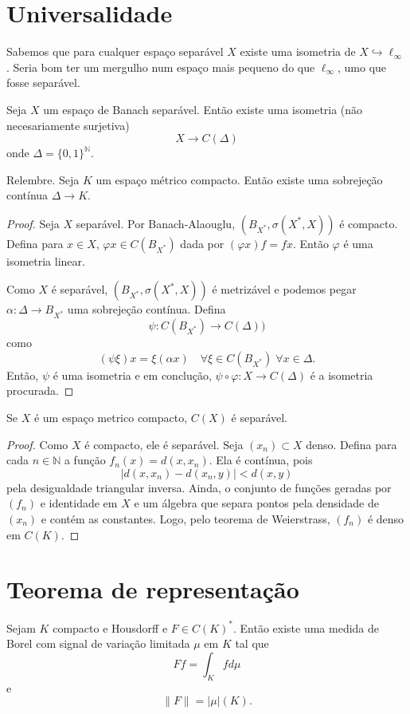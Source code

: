 \documentclass[portuguese]{article}
\theoremstyle{definition}
\newcommand{\N}{\mathbb{N}}
\begin{document}
\section{Universalidade}
Sabemos que para cualquer espaço separável $X$ existe uma isometria de $X\hookrightarrow\ell_\infty$. Seria bom ter um mergulho num espaço mais pequeno do que $\ell_\infty$, umo que fosse separável.

\begin{teo}
	Seja $X$ um espaço de Banach separável. Então existe uma isometria (não necesariamente surjetiva)
	\[X\to C(\Delta)\]
	onde $\Delta=\{0,1\}^\N$.
\end{teo}
\begin{obs}
	Relembre. Seja $K$ um espaço métrico compacto. Então existe uma sobrejeção contínua $\Delta\to K$.
\end{obs}
\begin{proof}
	Seja $X$ separável. Por Banach-Alaouglu, $(B_{X^*},\sigma(X^*,X))$ é compacto. Defina para $x\in X$, $\varphi x\in C(B_{X^*})$ dada por $(\varphi x)f=fx$. Então $\varphi$ é uma isometria linear.
	
	Como $X$ é separável, $(B_{X^*},\sigma(X^*,X))$ é metrizável e podemos pegar $\alpha:\Delta\to B_{X^*}$ uma sobrejeção contínua. Defina
	\[\psi:C(B_{X^*})\to C(\Delta))\]
	como
	\[(\psi\xi)x=\xi(\alpha x)\quad\forall\xi\in C(B_{X^*})\;\forall x\in\Delta.\]
	Então, $\psi$ é uma isometria e em conclução, $\psi\circ\varphi:X\to C(\Delta)$ é a isometria procurada.
\end{proof}
\begin{exer*}
	Se $X$ é um espaço metrico compacto, $C(X)$ é separável.
\end{exer*}
\begin{proof}
	Como $X$ é compacto, ele é separável. Seja $(x_n)\subset X$ denso. Defina para cada $n\in\N$ a função $f_n(x)=d(x,x_n)$. Ela é contínua, pois
	\[|d(x,x_n)-d(x_n,y)|<d(x,y)\]
	pela desigualdade triangular inversa. Ainda, o conjunto de funções geradas por $(f_n)$ e identidade em $X$ e um álgebra que separa pontos {\color{orange}pela densidade de $(x_n)$} e contém as constantes. Logo, pelo teorema de Weierstrass, $(f_n)$ é denso em $C(K)$.
\end{proof}

\section{Teorema de representação}
\begin{teo}
	Sejam $K$ compacto e Housdorff e $F\in C(K)^*$. Então existe uma medida de Borel com signal de variação limitada $\mu$ em $K$ tal que
	\[Ff=\int_K fd\mu\]
	e
	\[\|F\|=|\mu|(K).\]
\end{teo}
\end{document}
